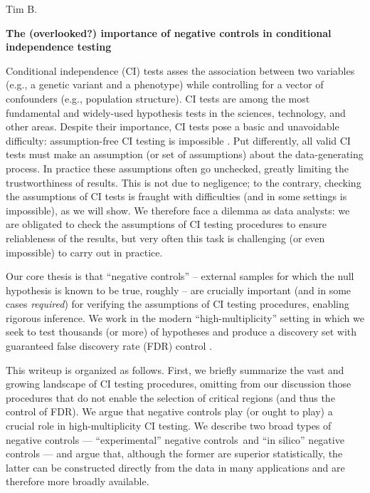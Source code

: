 \documentclass[12pt]{article}
\begin{document}
	\noindent
	Tim B.
	\begin{center}
		\textbf{The (overlooked?) importance of negative controls in conditional independence testing}
	\end{center}

Conditional independence (CI) tests asses the association between two variables (e.g., a genetic variant and a phenotype) while controlling for a vector of confounders (e.g., population structure). CI tests are among the most fundamental and widely-used hypothesis tests in the sciences, technology, and other areas. Despite their importance, CI tests pose a basic and unavoidable difficulty: assumption-free CI testing is impossible \parencite{Shah2020,Kim2021}. Put differently, all valid CI tests must make an assumption (or set of assumptions) about the data-generating process. In practice these assumptions often go unchecked, greatly limiting the trustworthiness of results. This is not due to negligence; to the contrary, checking the assumptions of CI tests is fraught with difficulties (and in some settings is impossible), as we will show. We therefore face a dilemma as data analysts: we are obligated to check the assumptions of CI testing procedures to ensure reliableness of the results, but very often this task is challenging (or even impossible) to carry out in practice.

Our core thesis is that ``negative controls'' -- external samples for which the null hypothesis is known to be true, roughly  -- are crucially important (and in some cases \textit{required}) for verifying the assumptions of CI testing procedures, enabling rigorous inference. We work in the modern ``high-multiplicity'' setting in which we seek to test thousands (or more) of hypotheses and produce a discovery set with guaranteed false discovery rate (FDR) control \parencite{Benjamini1995, Li2021}.

This writeup is organized as follows. First, we briefly summarize the vast and growing landscape of CI testing procedures, omitting from our discussion those procedures that do not enable the selection of critical regions (and thus the control of FDR). We argue that negative controls play (or ought to play) a crucial role in high-multiplicity CI testing. We describe two broad types of negative controls --- ``experimental'' negative controls and ``in silico'' negative controls --- and argue that, although the former are superior statistically, the latter can be constructed directly from the data in many applications and are therefore more broadly available.
\end{document}
